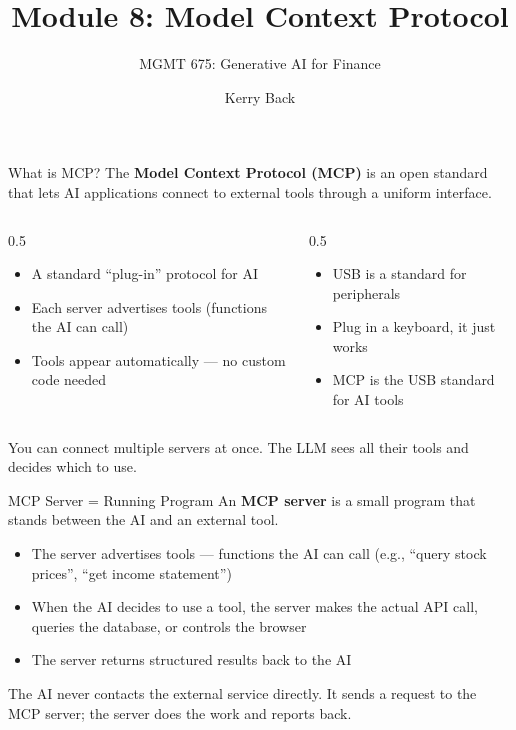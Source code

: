 \documentclass[aspectratio=169]{beamer}
\subtitle{MGMT 675: Generative AI for Finance}
\title{Module 8: Model Context Protocol}
\author{Kerry Back}
\date{}
\begin{document}
\maketitle

\begin{frame}{What is MCP?}
The \textbf{Model Context Protocol (MCP)} is an open standard that lets AI applications connect to external tools through a uniform interface.
\vspace{0.3cm}
\begin{columns}[T]
\begin{column}{0.5\textwidth}
\begin{shadedbox}[title=\textbf{The Idea}]
\begin{itemize}\small
  \item A standard ``plug-in'' protocol for AI
  \item Each server advertises tools (functions the AI can call)
  \item Tools appear automatically --- no custom code needed
\end{itemize}
\end{shadedbox}
\end{column}
\begin{column}{0.5\textwidth}
\begin{shadedbox}[title=\textbf{Analogy}]
\begin{itemize}\small
  \item USB is a standard for peripherals
  \item Plug in a keyboard, it just works
  \item MCP is the USB standard for AI tools
\end{itemize}
\end{shadedbox}
\end{column}
\end{columns}
\vspace{0.3cm}
You can connect multiple servers at once.  The LLM sees all their tools and decides which to use.
\end{frame}

\begin{frame}{MCP Server = Running Program}
An \textbf{MCP server} is a small program that stands between the AI and an external tool.
\vspace{0.3cm}
\begin{itemize}
  \item The server \alert{advertises tools} --- functions the AI can call (e.g., ``query stock prices'', ``get income statement'')
  \item When the AI decides to use a tool, the server \alert{makes the actual API call}, queries the database, or controls the browser
  \item The server returns structured results back to the AI
\end{itemize}
\vspace{0.3cm}
The AI never contacts the external service directly.  It sends a request to the MCP server; the server does the work and reports back.
\end{frame}
\end{document}
